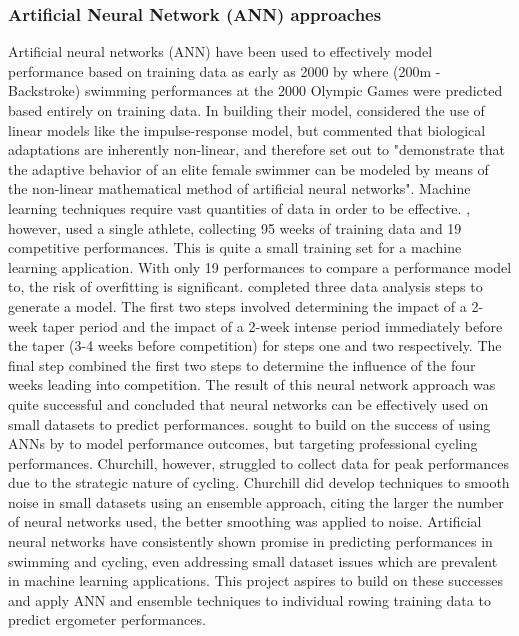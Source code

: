\subsubsection{Artificial Neural Network (ANN) approaches}
Artificial neural networks (ANN) have been used to effectively model performance based on training data as early as 2000 by \textcite{Edelmannnusser2002} where (200m - Backstroke) swimming performances at the 2000 Olympic Games were predicted based entirely on training data. In building their model, \textcite{Edelmannnusser2002} considered the use of linear models like the impulse-response model, but commented that biological adaptations are inherently non-linear, and therefore set out to "demonstrate that the adaptive behavior of an elite female swimmer can be modeled by means of the non-linear mathematical method of artificial neural networks". Machine learning techniques require vast quantities of data in order to be effective. \textcite{Edelmannnusser2002}, however, used a single athlete, collecting 95 weeks of training data and 19 competitive performances. This is quite a small training set for a machine learning application. With only 19 performances to compare a performance model to, the risk of overfitting is significant. \textcite{Edelmannnusser2002} completed three data analysis steps to generate a model. The first two steps involved determining the impact of a 2-week taper period and the impact of a 2-week intense period immediately before the taper (3-4 weeks before competition) for steps one and two respectively. The final step combined the first two steps to determine the influence of the four weeks leading into competition. The result of this neural network approach was quite successful and \textcite{Edelmannnusser2002} concluded that neural networks can be effectively used on small datasets to predict performances. \textcite{Churchill2014} sought to build on the success of using ANNs by \textcite{Edelmannnusser2002} to model performance outcomes, but targeting professional cycling performances. Churchill, however, struggled to collect data for peak performances due to the strategic nature of cycling. Churchill did develop techniques to smooth noise in small datasets using an ensemble approach, citing the larger the number of neural networks used, the better smoothing was applied to noise. Artificial neural networks have consistently shown promise in predicting performances in swimming and cycling, even addressing small dataset issues which are prevalent in machine learning applications. This project aspires to build on these successes and apply ANN and ensemble techniques to individual rowing training data to predict ergometer performances.
